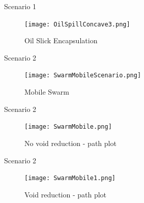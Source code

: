 \documentclass{beamer}
\begin{document}
\begin{frame}{Scenario 1}
  \begin{center}
    \begin{figure}
      \begin{center}
        \texttt{[image: OilSpillConcave3.png]}
      \end{center}
      \caption{Oil Slick Encapsulation}
    \end{figure}
  \end{center}
\end{frame}  

\begin{frame}{Scenario 2}
  \begin{center}
    \begin{figure}
      \begin{center}
        \texttt{[image: SwarmMobileScenario.png]}
      \end{center}
      \caption{Mobile Swarm}
    \end{figure}
  \end{center}    
\end{frame}  

\begin{frame}{Scenario 2}
      \begin{center}
        \begin{figure}
          \begin{center}
            \texttt{[image: SwarmMobile.png]}
          \end{center}
          \caption{No void reduction - path plot}
        \end{figure}
      \end{center}    
\end{frame}  

\begin{frame}{Scenario 2}
      \begin{center}
        \begin{figure}
          \begin{center}
            \texttt{[image: SwarmMobile1.png]}
          \end{center}
          \caption{Void reduction - path plot}
        \end{figure}
      \end{center}
\end{frame}  

\end{document}
